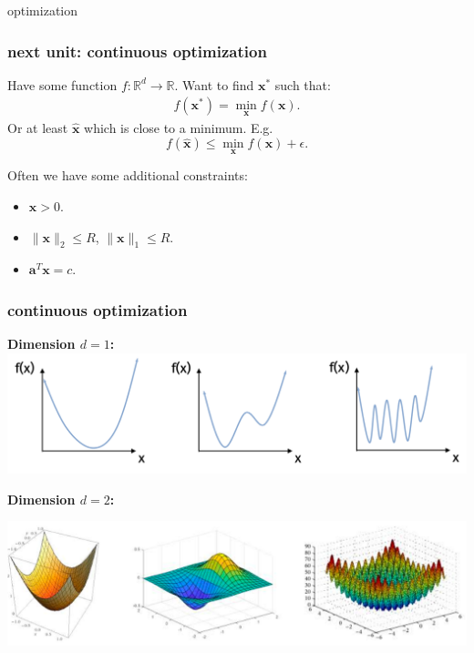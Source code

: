 \documentclass[compress]{beamer}
\newcommand{\bv}[1]{\mathbf{#1}}
\newcommand{\R}{\mathbb{R}}
\begin{document}
\begin{frame}[standout]
	\begin{center}
		optimization
	\end{center}
\end{frame}

\begin{frame}
	\frametitle{next unit: continuous optimization}
	Have some function $f : \R^d \rightarrow \R$. Want to find ${\bv{x}}^*$ such that:
	\begin{align*}
		f({\bv{x}}^*) = \min_{\bv{x}} f(\bv{x}).
	\end{align*}
	Or at least $\hat{\bv{x}}$ which is close to a minimum. E.g. $$f(\hat{\bv{x}}) \leq \min_{\bv{x}} f(\bv{x}) + \epsilon.$$
	
	Often we have some additional constraints:
	\begin{itemize}
		\item $\bv{x} > 0$.
		\item $\|\bv{x}\|_2 \leq R$, $\|\bv{x}\|_1 \leq R$.
		\item $\bv{a}^T\bv{x} = c$.
	\end{itemize}
\end{frame}

\begin{frame}
	\frametitle{continuous optimization}
	\textbf{Dimension $d = 1$:}
	\includegraphics[width=\textwidth]{1d_functions.png}
	
	\textbf{Dimension $d = 2$:}
	
	\includegraphics[width=\textwidth]{2dfunctions.png}
\end{frame}
\end{document}
